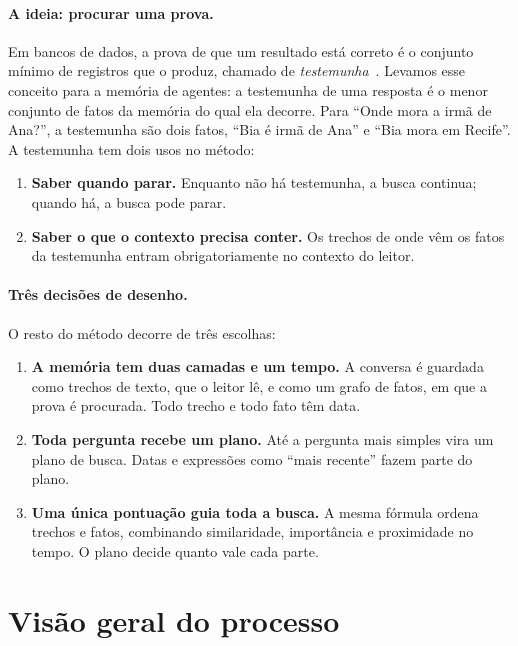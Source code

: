\documentclass[11pt]{article}
\begin{document}
\paragraph{A ideia: procurar uma prova.} Em bancos de dados, a prova de que
um resultado está correto é o conjunto mínimo de registros que o produz,
chamado de \emph{testemunha}~\citep{buneman2001why,green2007provenance}.
Levamos esse conceito para a memória de agentes: a testemunha de uma resposta
é o menor conjunto de fatos da memória do qual ela decorre. Para ``Onde mora a
irmã de Ana?'', a testemunha são dois fatos, ``Bia é irmã de Ana'' e ``Bia
mora em Recife''. A testemunha tem dois usos no método:
\begin{enumerate}[leftmargin=*,itemsep=2pt]
\item \textbf{Saber quando parar.} Enquanto não há testemunha, a busca
  continua; quando há, a busca pode parar.
\item \textbf{Saber o que o contexto precisa conter.} Os trechos de onde vêm
  os fatos da testemunha entram obrigatoriamente no contexto do leitor.
\end{enumerate}

\paragraph{Três decisões de desenho.} O resto do método decorre de três
escolhas:
\begin{enumerate}[leftmargin=*,itemsep=2pt]
\item \textbf{A memória tem duas camadas e um tempo.} A conversa é guardada
  como trechos de texto, que o leitor lê, e como um grafo de fatos, em que a
  prova é procurada. Todo trecho e todo fato têm data.
\item \textbf{Toda pergunta recebe um plano.} Até a pergunta mais simples vira
  um plano de busca. Datas e expressões como ``mais recente'' fazem parte do
  plano.
\item \textbf{Uma única pontuação guia toda a busca.} A mesma fórmula ordena
  trechos e fatos, combinando similaridade, importância e proximidade no
  tempo. O plano decide quanto vale cada parte.
\end{enumerate}

\section{Visão geral do processo}
\label{sec:visao}
\end{document}
